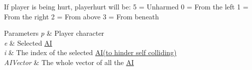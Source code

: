 \begin{DoxyItemize}
\item If player is being hurt, playerhurt will be\+: 5 = Unharmed 0 = From the left 1 = From the right 2 = From above 3 = From beneath 
\begin{DoxyParams}{Parameters}
{\em p} & Player character \\
\hline
{\em e} & Selected \hyperlink{classAI}{AI} \\
\hline
{\em i} & The index of the selected \hyperlink{classAI}{A\+I(to hinder self colliding)} \\
\hline
{\em A\+I\+Vector} & The whole vector of all the \hyperlink{classAI}{AI} \\
\hline
\end{DoxyParams}

\end{DoxyItemize}
